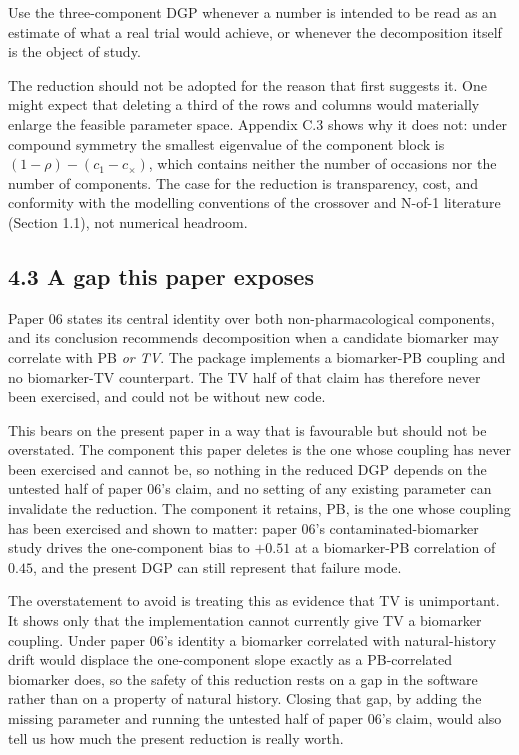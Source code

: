 \documentclass[
  11pt,
]{article}
\begin{document}
Use the three-component DGP whenever a number is intended to be read
as an estimate of what a real trial would achieve, or whenever the
decomposition itself is the object of study.

The reduction should not be adopted for the reason that first
suggests it. One might expect that deleting a third of the rows and
columns would materially enlarge the feasible parameter space.
Appendix C.3 shows why it does not: under compound symmetry the
smallest eigenvalue of the component block is
\((1-\rho) - (c_1 - c_{\times})\), which contains neither the number of
occasions nor the number of components. The case for the reduction is
transparency, cost, and conformity with the modelling conventions of
the crossover and N-of-1 literature (Section 1.1), not numerical
headroom.

\subsection{4.3 A gap this paper exposes}

Paper 06 states its central identity over both non-pharmacological
components, and its conclusion recommends decomposition when a
candidate biomarker may correlate with PB \emph{or TV}. The package
implements a biomarker-PB coupling and no biomarker-TV counterpart.
The TV half of that claim has therefore never been exercised, and
could not be without new code.

This bears on the present paper in a way that is favourable but
should not be overstated. The component this paper deletes is the one
whose coupling has never been exercised and cannot be, so nothing in
the reduced DGP depends on the untested half of paper 06's claim, and
no setting of any existing parameter can invalidate the reduction.
The component it retains, PB, is the one whose coupling has been
exercised and shown to matter: paper 06's contaminated-biomarker
study drives the one-component bias to \(+0.51\) at a biomarker-PB
correlation of \(0.45\), and the present DGP can still represent that
failure mode.

The overstatement to avoid is treating this as evidence that TV is
unimportant. It shows only that the implementation cannot currently
give TV a biomarker coupling. Under paper 06's identity a biomarker
correlated with natural-history drift would displace the
one-component slope exactly as a PB-correlated biomarker does, so the
safety of this reduction rests on a gap in the software rather than
on a property of natural history. Closing that gap, by adding the
missing parameter and running the untested half of paper 06's claim,
would also tell us how much the present reduction is really worth.
\end{document}
